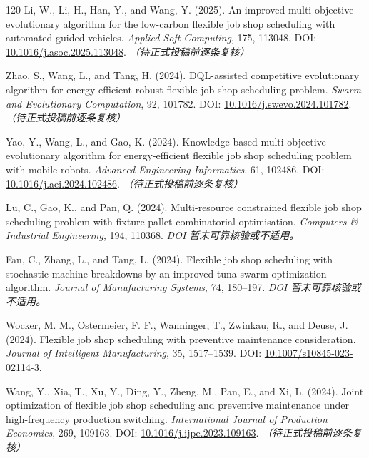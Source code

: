 \documentclass[UTF8,a4paper,11pt]{ctexart}
\begin{document}
\begin{thebibliography}{120}
Li, W., Li, H., Han, Y., and Wang, Y. (2025). An improved multi-objective evolutionary algorithm for the low-carbon flexible job shop scheduling with automated guided vehicles. \emph{Applied Soft Computing}, 175, 113048.
\newblock DOI: \href{https://doi.org/10.1016/j.asoc.2025.113048}{10.1016/j.asoc.2025.113048}. \textit{（待正式投稿前逐条复核）}

Zhao, S., Wang, L., and Tang, H. (2024). DQL-assisted competitive evolutionary algorithm for energy-efficient robust flexible job shop scheduling problem. \emph{Swarm and Evolutionary Computation}, 92, 101782.
\newblock DOI: \href{https://doi.org/10.1016/j.swevo.2024.101782}{10.1016/j.swevo.2024.101782}. \textit{（待正式投稿前逐条复核）}

Yao, Y., Wang, L., and Gao, K. (2024). Knowledge-based multi-objective evolutionary algorithm for energy-efficient flexible job shop scheduling problem with mobile robots. \emph{Advanced Engineering Informatics}, 61, 102486.
\newblock DOI: \href{https://doi.org/10.1016/j.aei.2024.102486}{10.1016/j.aei.2024.102486}. \textit{（待正式投稿前逐条复核）}

Lu, C., Gao, K., and Pan, Q. (2024). Multi-resource constrained flexible job shop scheduling problem with fixture-pallet combinatorial optimisation. \emph{Computers \& Industrial Engineering}, 194, 110368.
\newblock \textit{DOI 暂未可靠核验或不适用。}

Fan, C., Zhang, L., and Tang, L. (2024). Flexible job shop scheduling with stochastic machine breakdowns by an improved tuna swarm optimization algorithm. \emph{Journal of Manufacturing Systems}, 74, 180--197.
\newblock \textit{DOI 暂未可靠核验或不适用。}

Wocker, M. M., Ostermeier, F. F., Wanninger, T., Zwinkau, R., and Deuse, J. (2024). Flexible job shop scheduling with preventive maintenance consideration. \emph{Journal of Intelligent Manufacturing}, 35, 1517--1539.
\newblock DOI: \href{https://doi.org/10.1007/s10845-023-02114-3}{10.1007/s10845-023-02114-3}.

Wang, Y., Xia, T., Xu, Y., Ding, Y., Zheng, M., Pan, E., and Xi, L. (2024). Joint optimization of flexible job shop scheduling and preventive maintenance under high-frequency production switching. \emph{International Journal of Production Economics}, 269, 109163.
\newblock DOI: \href{https://doi.org/10.1016/j.ijpe.2023.109163}{10.1016/j.ijpe.2023.109163}. \textit{（待正式投稿前逐条复核）}


\end{thebibliography}
\end{document}
